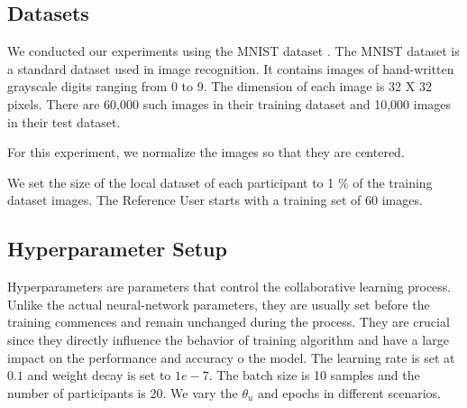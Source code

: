 \documentclass[conference]{IEEEtran}
\begin{document}
\subsection{Datasets}
We conducted our experiments using the MNIST dataset \cite{deng2012mnist}. The MNIST dataset is a standard dataset used in image
recognition.
It contains images of hand-written grayscale digits ranging from 0 to 9. The dimension of each image is 32 X 32 pixels. There
are 60,000 such images in their training dataset and 10,000 images in their test dataset.

For this experiment, we normalize the images so that they are centered. 

We set the size of the local dataset of each participant to 1 \% of the training dataset images. 
The Reference User starts with a training set of 60 images.



\subsection{Hyperparameter Setup}

Hyperparameters are parameters that control the collaborative learning process. Unlike the actual neural-network parameters, they are usually set before the training commences and remain unchanged during the process.
They are crucial since they directly influence the behavior of training algorithm and have a large impact on the performance and accuracy o the model.
The learning rate is set at $0.1$ and weight decay is set to $1e-7$. The batch size is 10 samples and the number of participants is 20. We vary the $\theta_u$ and epochs in different scenarios. 
\end{document}
